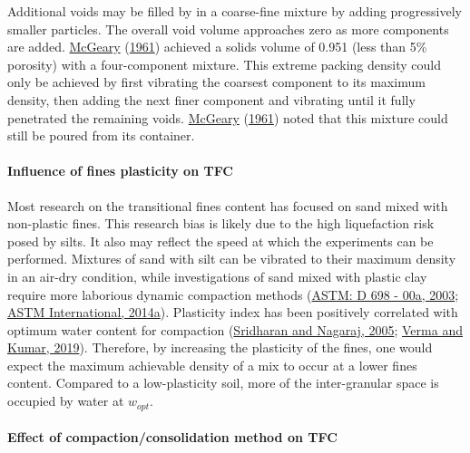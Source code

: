 \documentclass[
  letterpaper,
  openany]{book}
\begin{document}
Additional voids may be filled by in a coarse-fine mixture by adding progressively smaller particles.
The overall void volume approaches zero as more components are added.
\protect\hyperlink{ref-McGeary1961}{McGeary} (\protect\hyperlink{ref-McGeary1961}{1961}) achieved a solids volume of 0.951 (less than 5\% porosity) with a four-component mixture.
This extreme packing density could only be achieved by first vibrating the coarsest component to its maximum density, then adding the next finer component and vibrating until it fully penetrated the remaining voids.
\protect\hyperlink{ref-McGeary1961}{McGeary} (\protect\hyperlink{ref-McGeary1961}{1961}) noted that this mixture could still be poured from its container.

\hypertarget{influence-of-fines-plasticity-on-tfc}{%
\paragraph{Influence of fines plasticity on TFC}\label{influence-of-fines-plasticity-on-tfc}}

Most research on the transitional fines content has focused on sand mixed with non-plastic fines.
This research bias is likely due to the high liquefaction risk posed by silts.
It also may reflect the speed at which the experiments can be performed.
Mixtures of sand with silt can be vibrated to their maximum density in an air-dry condition, while investigations of sand mixed with plastic clay require more laborious dynamic compaction methods (\protect\hyperlink{ref-ASTMD698-12e2}{ASTM: D 698 - 00a, 2003}; \protect\hyperlink{ref-ASTMD4253-16}{ASTM International, 2014a}).
Plasticity index has been positively correlated with optimum water content for compaction (\protect\hyperlink{ref-Sridharan2005a}{Sridharan and Nagaraj, 2005}; \protect\hyperlink{ref-Verma2019}{Verma and Kumar, 2019}).
Therefore, by increasing the plasticity of the fines, one would expect the maximum achievable density of a mix to occur at a lower fines content. Compared to a low-plasticity soil, more of the inter-granular space is occupied by water at \(w_{opt}\).

\hypertarget{effect-of-compactionconsolidation-method-on-tfc}{%
\paragraph{Effect of compaction/consolidation method on TFC}\label{effect-of-compactionconsolidation-method-on-tfc}}
\end{document}
